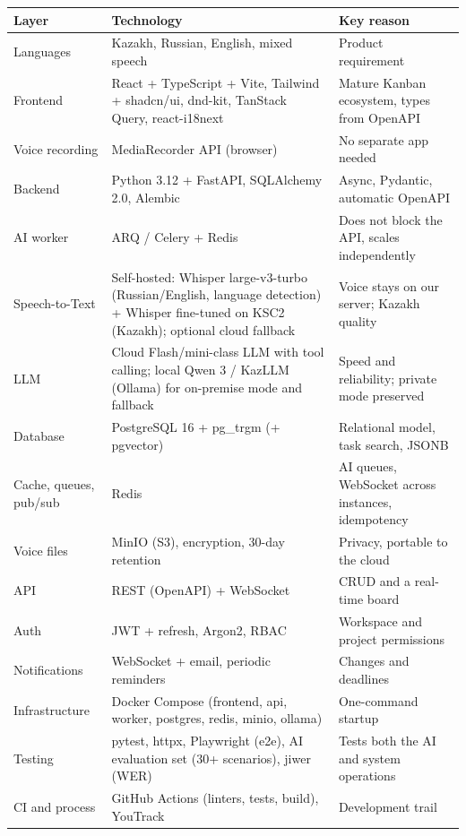 \documentclass[11pt,a4paper]{article}
\newcommand{\tblstart}{\small\rowcolors{2}{gray!7}{white}}
\begin{document}
{\tblstart
\begin{xltabular}{\textwidth}{P{3.2cm} P{6.6cm} L}
\toprule
\textbf{Layer} & \textbf{Technology} & \textbf{Key reason} \\
\midrule
\endhead
Languages & Kazakh, Russian, English, mixed speech & Product requirement \\
Frontend & React + TypeScript + Vite, Tailwind + shadcn/ui, dnd-kit, TanStack Query, react-i18next & Mature Kanban ecosystem, types from OpenAPI \\
Voice recording & MediaRecorder API (browser) & No separate app needed \\
Backend & Python 3.12 + FastAPI, SQLAlchemy 2.0, Alembic & Async, Pydantic, automatic OpenAPI \\
AI worker & ARQ / Celery + Redis & Does not block the API, scales independently \\
Speech-to-Text & Self-hosted: Whisper large-v3-turbo (Russian/English, language detection) + Whisper fine-tuned on KSC2 (Kazakh); optional cloud fallback & Voice stays on our server; Kazakh quality \\
LLM & Cloud Flash/mini-class LLM with tool calling; local Qwen 3 / KazLLM (Ollama) for on-premise mode and fallback & Speed and reliability; private mode preserved \\
Database & PostgreSQL 16 + pg\_trgm (+ pgvector) & Relational model, task search, JSONB \\
Cache, queues, pub/sub & Redis & AI queues, WebSocket across instances, idempotency \\
Voice files & MinIO (S3), encryption, 30-day retention & Privacy, portable to the cloud \\
API & REST (OpenAPI) + WebSocket & CRUD and a real-time board \\
Auth & JWT + refresh, Argon2, RBAC & Workspace and project permissions \\
Notifications & WebSocket + email, periodic reminders & Changes and deadlines \\
Infrastructure & Docker Compose (frontend, api, worker, postgres, redis, minio, ollama) & One-command startup \\
Testing & pytest, httpx, Playwright (e2e), AI evaluation set (30+ scenarios), jiwer (WER) & Tests both the AI and system operations \\
CI and process & GitHub Actions (linters, tests, build), YouTrack & Development trail \\
\bottomrule
\end{xltabular}}
\end{document}
